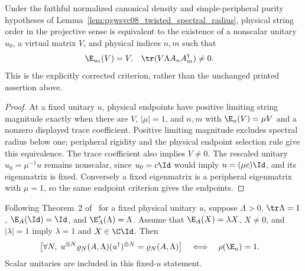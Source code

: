 \begin{lemma}
    \label{thm:projective_physical_string_order}
    \leanok
    Under the faithful normalized canonical density and simple-peripheral
    purity hypotheses of Lemma~\ref{lem:pgwsvc08_twisted_spectral_radius},
    physical string order in the projective sense is equivalent to
    the existence of a nonscalar unitary $u_0$, a virtual matrix $V$,
    and physical indices $n,m$ such that
    \begin{align}
        \E_{u_0}(V) & =V,
                    & \tr(V\Lambda A_nA_m^\dagger) & \ne0.
        \label{eq:projective_physical_string_order}
    \end{align}
    This is the explicitly corrected criterion, rather than the
    unchanged printed assertion above.
\end{lemma}
\begin{proof}\leanok
    At a fixed unitary $u$, physical endpoints have positive limiting
    string magnitude exactly when there are $V$, $|\mu|=1$, and $n,m$
    with $\E_u(V)=\mu V$ and a nonzero displayed trace coefficient.
    Positive limiting magnitude excludes spectral radius below one;
    peripheral rigidity and the physical endpoint selection rule give
    this equivalence. The trace coefficient also implies $V\ne0$.
    The rescaled unitary $u_0=\mu^{-1}u$ remains nonscalar, since
    $u_0=c\Id$ would imply $u=(\mu c)\Id$, and its eigenmatrix is fixed.
    Conversely a fixed eigenmatrix is a peripheral eigenmatrix with
    $\mu=1$, so the same endpoint criterion gives the endpoints.
\end{proof}



\begin{lemma}
    \label{thm:pgwsvc08_physical_symmetry}
    \leanok
    Following Theorem~2 of~\cite{PerezGarcia2008StringOrder} for a fixed
    physical unitary $u$, suppose $\Lambda>0$, $\tr\Lambda=1$,
    $\E_A(\Id)=\Id$, and $\E_A^*(\Lambda)=\Lambda$. Assume that
    $\E_A(X)=\lambda X$, $X\ne0$, and $|\lambda|=1$ imply
    $\lambda=1$ and $X\in\C\Id$. Then
    \begin{align}
        \bigl[\forall N,\;
            u^{\otimes N}\varrho_N(A,\Lambda)(u^\dagger)^{\otimes N}
            =\varrho_N(A,\Lambda)\bigr]
         & \quad\Longleftrightarrow\quad \rho(\E_u)=1.
        \label{eq:stationary_density_symmetry}
    \end{align}
    Scalar unitaries are included in this fixed-$u$ statement.
\end{lemma}

